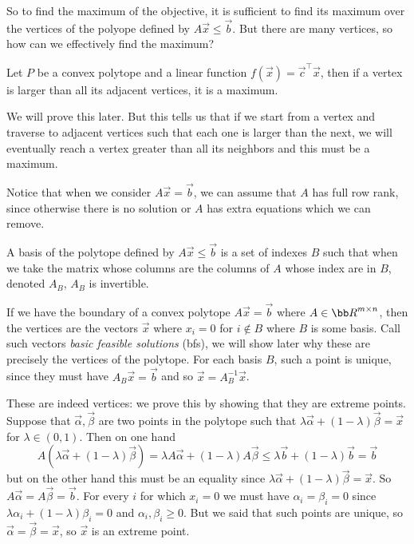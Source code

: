 So to find the maximum of the objective, it is sufficient to find its maximum over the vertices of the polyope defined by $A\vec x\leq\vec b$.
But there are many vertices, so how can we effectively find the maximum?

\blemm[name=localmax]

    Let $P$ be a convex polytope and a linear function $f(\vec x)=\vec c^\top\vec x$, then if a vertex is larger than all its adjacent vertices, it is a maximum.

\elemm

We will prove this later.
But this tells us that if we start from a vertex and traverse to adjacent vertices such that each one is larger than the next, we will eventually reach a vertex greater than all its neighbors and this must
be a maximum.

Notice that when we consider $A\vec x=\vec b$, we can assume that $A$ has full row rank, since otherwise there is no solution or $A$ has extra equations which we can remove.

\bdefn

    A {\emphcolor basis} of the polytope defined by $A\vec x\leq\vec b$ is a set of indexes $B$ such that when we take the matrix whose columns are the columns of $A$ whose index are in $B$, denoted $A_B$,
    $A_B$ is invertible.

\edefn

If we have the boundary of a convex polytope $A\vec x=\vec b$ where $A\in{\bb R}^{m\times n}$, then the vertices are the vectors $\vec x$ where $x_i=0$ for $i\notin B$ where $B$ is some basis.
Call such vectors {\it basic feasible solutions} (bfs), we will show later why these are precisely the vertices of the polytope.
For each basis $B$, such a point is unique, since they must have $A_B\vec x=\vec b$ and so $\vec x=A_B^{-1}\vec x$.

These are indeed vertices: we prove this by showing that they are extreme points.
Suppose that $\vec\alpha,\vec\beta$ are two points in the polytope such that $\lambda\vec\alpha+(1-\lambda)\vec\beta=\vec x$ for $\lambda\in(0,1)$.
Then on one hand
$$ A(\lambda\vec\alpha+(1-\lambda)\vec\beta) = \lambda A\vec\alpha + (1-\lambda)A\vec\beta \leq\lambda\vec b+(1-\lambda)\vec b=\vec b $$
but on the other hand this must be an equality since $\lambda\vec\alpha+(1-\lambda)\vec\beta=\vec x$.
So $A\vec\alpha=A\vec\beta=\vec b$.
For every $i$ for which $x_i=0$ we must have $\alpha_i=\beta_i=0$ since $\lambda\alpha_i+(1-\lambda)\beta_i=0$ and $\alpha_i,\beta_i\geq0$.
But we said that such points are unique, so $\vec\alpha=\vec\beta=\vec x$, so $\vec x$ is an extreme point.

